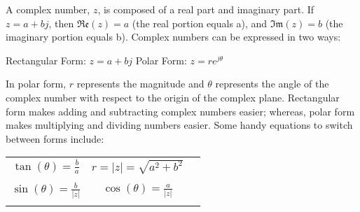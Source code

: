 \pgfplotsset{width=7cm,compat=1.16}





A complex number, $z$, is composed of a real part and imaginary part.
If $z = a + bj$, then $\mathfrak{Re}(z) = a$ (the real portion equals a), and $\mathfrak{Im}(z) = b$ (the imaginary portion equals b).
Complex numbers can be expressed in two ways:

\begin{center}
Rectangular Form: $z = a + bj$ \hspace{1em} Polar Form: $z = re^{j\theta}$
\end{center}

In polar form, $r$ represents the magnitude and $\theta$ represents the angle of the complex number with respect to the origin of the complex plane.
Rectangular form makes adding and subtracting complex numbers easier; whereas, polar form makes multiplying and dividing numbers easier.
Some handy equations to switch between forms include:

\begin{center}

\begin{tabular}{ c c c }
 $\tan(\theta) = \frac{b}{a}$ & $r = |z| = \sqrt{a^2 + b^2}$ \\ \\
 $\sin(\theta) = \frac{b}{|z|}$ & $\cos(\theta) = \frac{a}{|z|}$ \\  \\
\end{tabular}

\end{center}

